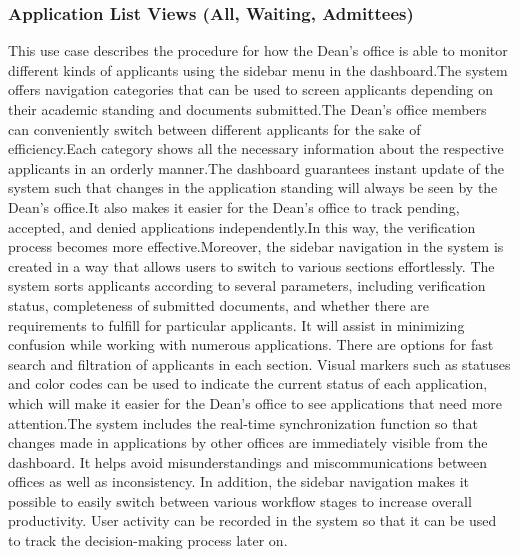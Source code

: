 \subsubsection{Application List Views (All, Waiting, Admittees)}

This use case describes the procedure for how the Dean's office is able to monitor different kinds of applicants using the sidebar menu in the dashboard.The system offers navigation categories that can be used to screen applicants depending on their academic standing and documents submitted.The Dean's office members can conveniently switch between different applicants for the sake of efficiency.Each category shows all the necessary information about the respective applicants in an orderly manner.The dashboard guarantees instant update of the system such that changes in the application standing will always be seen by the Dean's office.It also makes it easier for the Dean's office to track pending, accepted, and denied applications independently.In this way, the verification process becomes more effective.Moreover, the sidebar navigation in the system is created in a way that allows users to switch to various sections effortlessly. The system sorts applicants according to several parameters, including verification status, completeness of submitted documents, and whether there are requirements to fulfill for particular applicants. It will assist in minimizing confusion while working with numerous applications. There are options for fast search and filtration of applicants in each section. Visual markers such as statuses and color codes can be used to indicate the current status of each application, which will make it easier for the Dean's office to see applications that need more attention.The system includes the real-time synchronization function so that changes made in applications by other offices are immediately visible from the dashboard. It helps avoid misunderstandings and miscommunications between offices as well as inconsistency. In addition, the sidebar navigation makes it possible to easily switch between various workflow stages to increase overall productivity. User activity can be recorded in the system so that it can be used to track the decision-making process later on.

